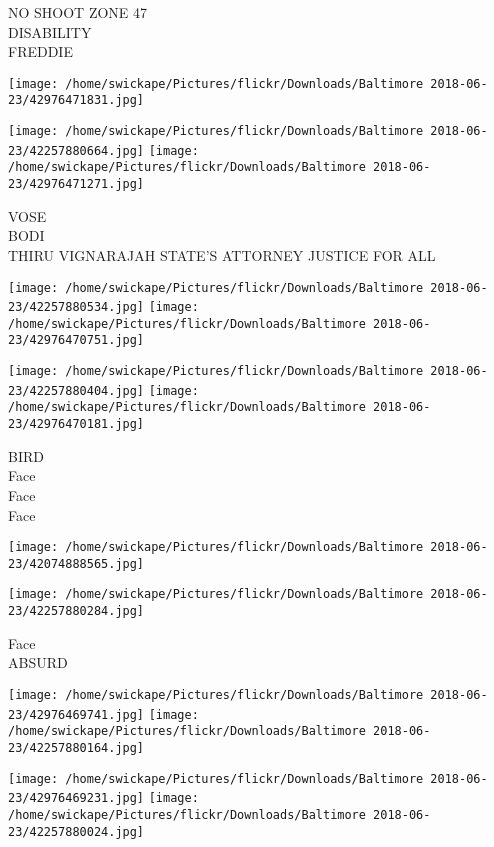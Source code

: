 \documentclass[10pt,letterpaper]{article}
\begin{document}
NO SHOOT ZONE 47\\
DISABILITY\\
FREDDIE\\
\pagebreak

\texttt{[image: /home/swickape/Pictures/flickr/Downloads/Baltimore 2018-06-23/42976471831.jpg]}

\vspace{0.25in}
\texttt{[image: /home/swickape/Pictures/flickr/Downloads/Baltimore 2018-06-23/42257880664.jpg]}
\texttt{[image: /home/swickape/Pictures/flickr/Downloads/Baltimore 2018-06-23/42976471271.jpg]}

VOSE\\
BODI\\
THIRU VIGNARAJAH STATE'S ATTORNEY JUSTICE FOR ALL\\
\pagebreak

\texttt{[image: /home/swickape/Pictures/flickr/Downloads/Baltimore 2018-06-23/42257880534.jpg]}
\texttt{[image: /home/swickape/Pictures/flickr/Downloads/Baltimore 2018-06-23/42976470751.jpg]}

\texttt{[image: /home/swickape/Pictures/flickr/Downloads/Baltimore 2018-06-23/42257880404.jpg]}
\texttt{[image: /home/swickape/Pictures/flickr/Downloads/Baltimore 2018-06-23/42976470181.jpg]}

BIRD\\
Face\\
Face\\
Face\\
\pagebreak

\texttt{[image: /home/swickape/Pictures/flickr/Downloads/Baltimore 2018-06-23/42074888565.jpg]}

\vspace{0.25in}
\texttt{[image: /home/swickape/Pictures/flickr/Downloads/Baltimore 2018-06-23/42257880284.jpg]}

Face\\
ABSURD\\
\pagebreak

\texttt{[image: /home/swickape/Pictures/flickr/Downloads/Baltimore 2018-06-23/42976469741.jpg]}
\texttt{[image: /home/swickape/Pictures/flickr/Downloads/Baltimore 2018-06-23/42257880164.jpg]}

\texttt{[image: /home/swickape/Pictures/flickr/Downloads/Baltimore 2018-06-23/42976469231.jpg]}
\texttt{[image: /home/swickape/Pictures/flickr/Downloads/Baltimore 2018-06-23/42257880024.jpg]}
\end{document}
